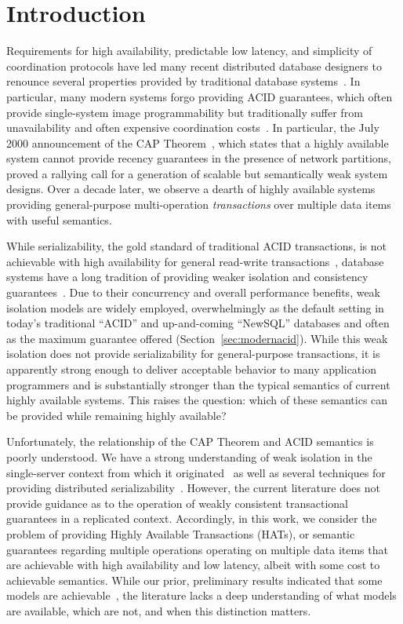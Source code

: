 

\section{Introduction}

Requirements for high availability, predictable low latency, and
simplicity of coordination protocols have led many recent distributed
database designers to renounce several properties provided by
traditional database systems~\cite{bigtable, pnuts, dynamo}. In
particular, many modern systems forgo providing ACID guarantees, which
often provide single-system image programmability but traditionally
suffer from unavailability and often expensive coordination
costs~\cite{davidson-survey}. In particular, the July 2000
announcement of the CAP Theorem~\cite{gilbert-cap}, which states that
a highly available system cannot provide recency guarantees in the
presence of network partitions, proved a rallying call for a
generation of scalable but semantically weak system designs. Over a
decade later, we observe a dearth of highly available systems
providing general-purpose multi-operation \textit{transactions} over
multiple data items with useful semantics.

While serializability, the gold standard of traditional ACID
transactions, is not achievable with high availability for general
read-write transactions~\cite{davidson-survey}, database systems have
a long tradition of providing weaker isolation and consistency
guarantees~\cite{adya, ansicritique, gray-isolation}. Due to their
concurrency and overall performance benefits, weak isolation models
are widely employed, overwhelmingly as the default setting in today's
traditional ``ACID'' and up-and-coming ``NewSQL'' databases and often
as the maximum guarantee offered (Section~\ref{sec:modernacid}). While
this weak isolation does not provide serializability for
general-purpose transactions, it is apparently strong enough to
deliver acceptable behavior to many application programmers and is
substantially stronger than the typical semantics of current highly
available systems. This raises the question: which of these semantics
can be provided while remaining highly available?

Unfortunately, the relationship of the CAP Theorem and ACID semantics
is poorly understood. We have a strong understanding of weak isolation
in the single-server context from which it originated~\cite{adya,
  ansicritique, gray-isolation} as well as several techniques for
providing distributed serializability~\cite{bernstein-concurrency,
  spanner, granola, daudjee-session, calvin}. However, the current
literature does not provide guidance as to the operation of weakly
consistent transactional guarantees in a replicated
context. Accordingly, in this work, we consider the problem of
providing Highly Available Transactions (HATs), or semantic guarantees
regarding multiple operations operating on multiple data items that
are achievable with high availability and low latency, albeit with
some cost to achievable semantics. While our prior, preliminary
results indicated that some models are achievable~\cite{hat-hotos},
the literature lacks a deep understanding of what models are
available, which are not, and when this distinction matters.

